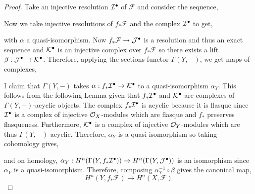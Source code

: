 \documentclass[12pt]{extarticle}
\theoremstyle{definition}
\newcommand{\F}{\mathcal{F}}
\begin{document}
\begin{proof}
Take an injective resolution $\mathcal{I}^\bullet$ of $\F$ and consider the sequence,
\begin{center}
\end{center}
Now we take injective resolutions of $f_* \F$ and the complex $\mathcal{I}^\bullet$ to get,
\begin{center}
\end{center}
with $\alpha$ a quasi-isomorphism.
Now $f_* \F \to \J^\bullet$ is a resolution and thus an exact sequence and $\mathcal{K}^\bullet$ is an injective complex over $f_* \F$ so there exists a lift $\beta : \mathcal{J}^\bullet \to \mathcal{K}^\bullet$. Therefore, applying the sections functor $\Gamma(Y, -)$, we get maps of complexes,
\begin{center}
\end{center} 
I claim that $\Gamma(Y, -)$ takes $\alpha : f_* \mathcal{I}^\bullet \to \mathcal{K}^\bullet$ to a quasi-isomorphism $\alpha_Y$. This follows from the following Lemma given that $f_* \mathcal{I}^\bullet$ and $\mathcal{K}^\bullet$ are complexes of $\Gamma(Y,-)$-acyclic objects. The complex $f_* \mathcal{I}^\bullet$ is acyclic because it is flasque since $\mathcal{I}^\bullet$ is a complex of injective $\mathcal{O}_{X}$-modules which are flasque and $f_*$ preserves flasqueness. Furthermore, $\mathcal{K}^\bullet$ is a complex of injective $\mathcal{O}_{Y}$-modules which are thus $\Gamma(Y, -)$-acyclic. Therefore, $\alpha_Y$ is a quasi-isomorphism so taking cohomology gives,
\begin{center}
\end{center} 
and on homology, $\alpha_Y : H^n(\Gamma(Y, f_* \mathcal{I}^\bullet)) \to H^n(\Gamma(Y, \mathcal{J}^\bullet))$ is an isomorphism since $\alpha_Y$ is a quasi-isomorphism. Therefore, composing $\alpha_Y^{-1} \circ \beta$ gives the canonical map,
\[ H^n(Y, f_* \F) \to H^n(X, \F)  \]
\end{proof}
\end{document}
